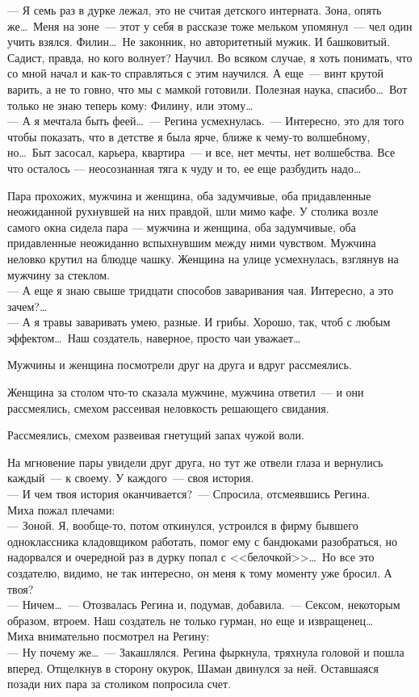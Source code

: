 \noindent --- Я семь раз в дурке лежал, это не считая детского интерната. Зона, опять 
же\ldots\ Меня на зоне~--- этот у себя в рассказе тоже мельком упомянул~--- чел один 
учить взялся. Филин\ldots\ Не законник, но авторитетный мужик. И башковитый. Садист, 
правда, но кого волнует? Научил. Во всяком случае, я хоть понимать, что со мной 
начал и как-то справляться с этим научился. А еще~--- винт крутой варить, а не 
то говно, что мы с мамкой готовили. Полезная наука, спасибо\ldots\ Вот только не 
знаю теперь кому: Филину, или этому\ldots\\
--- А я мечтала быть феей\ldots~--- Регина усмехнулась.~--- Интересно, это для 
того чтобы показать, что в детстве я была ярче, ближе к чему-то волшебному, но\ldots\ Быт 
засосал, карьера, квартира~--- и все, нет мечты, нет волшебства. Все что 
осталось --- неосознанная тяга к чуду и то, ее еще разбудить надо\ldots

Пара прохожих, мужчина и женщина, оба задумчивые, оба придавленные неожиданной 
рухнувшей на них правдой, шли мимо кафе. У столика возле самого окна сидела 
пара --- мужчина и женщина, оба задумчивые, оба придавленные неожиданно вспыхнувшим 
между ними чувством. Мужчина неловко крутил на блюдце чашку. Женщина на улице 
усмехнулась, взглянув на мужчину за стеклом.\\
--- А еще я знаю свыше тридцати способов заваривания чая. Интересно, а это 
зачем?\ldots\\
--- А я травы заваривать умею, разные. И грибы. Хорошо, так, чтоб с любым 
эффектом\ldots\ Наш создатель, наверное, просто чаи уважает\ldots

Мужчины и женщина посмотрели друг на друга и вдруг рассмеялись.

Женщина за столом что-то сказала мужчине, мужчина ответил~--- и они 
рассмеялись, смехом рассеивая неловкость решающего свидания.

Рассмеялись, смехом развеивая гнетущий запах чужой воли. 

На мгновение пары увидели друг друга, но тут же отвели глаза и вернулись 
каждый~--- к своему. У каждого~--- своя история.\\
--- И чем твоя история оканчивается?~--- Спросила, отсмеявшись Регина.\\
Миха пожал плечами:\\
--- Зоной. Я, вообще-то, потом откинулся, устроился в фирму бывшего одноклассника 
кладовщиком работать, помог ему с бандюками разобраться, но надорвался и 
очередной раз в дурку попал с <<белочкой>>\ldots\ Но все это создателю, видимо, 
не так интересно, он меня к тому моменту уже бросил. А твоя?\\
--- Ничем\ldots~--- Отозвалась Регина и, подумав, добавила.~--- Сексом, 
некоторым образом, втроем. Наш создатель не только гурман, но еще и извращенец\ldots\\
Миха внимательно посмотрел на Регину:\\
--- Ну почему же\ldots~--- Закашлялся. Регина фыркнула, тряхнула головой и пошла 
вперед. Отщелкнув в сторону окурок, Шаман двинулся за ней. Оставшаяся позади 
них пара за столиком попросила счет.\\
~\\

